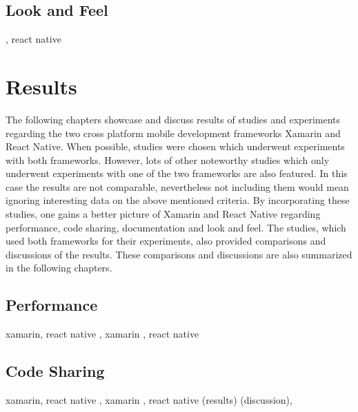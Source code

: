 \documentclass[Bachelor,BIF,english]{twbook}
\begin{document}
\subsection{Look and Feel}
\cite[p.~18]{GaouarBenamarBendimerad2016}, react native \cite[p.~25]{Danielsson_2016} \cite[p.~31]{Hansson_Vidhall_2016}


\section{Results}
The following chapters showcase and discuss results of studies and experiments regarding the two cross platform mobile development frameworks Xamarin and React Native. When possible, studies were chosen which underwent experiments with both frameworks. However, lots of other noteworthy studies which only underwent experiments with one of the two frameworks are also featured. In this case the results are not comparable, nevertheless not including them would mean ignoring interesting data on the above mentioned criteria. By incorporating these studies, one gains a better picture of Xamarin and React Native regarding performance, code sharing, documentation and look and feel. The studies, which used both frameworks for their experiments, also provided comparisons and discussions of the results. These comparisons and discussions are also summarized in the following chapters.

\subsection{Performance}
xamarin, react native \cite[p.~30-32]{ZubaBernhard2017EdPb}, xamarin \cite{Armgren_2015} \cite{WillocxVossaertNaessens2015}, react native \cite[p.~67-68]{Axelsson2016} \cite[p.~34-43]{Hansson_Vidhall_2016}
\subsection{Code Sharing}
xamarin, react native \cite[p.~71-72]{ZubaBernhard2017EdPb}, xamarin \cite[p.~185]{MartinezLecomte2017}, react native (results\cite[p.~44]{Hansson_Vidhall_2016}) (discussion\cite[p.~53]{Hansson_Vidhall_2016}),
\end{document}
